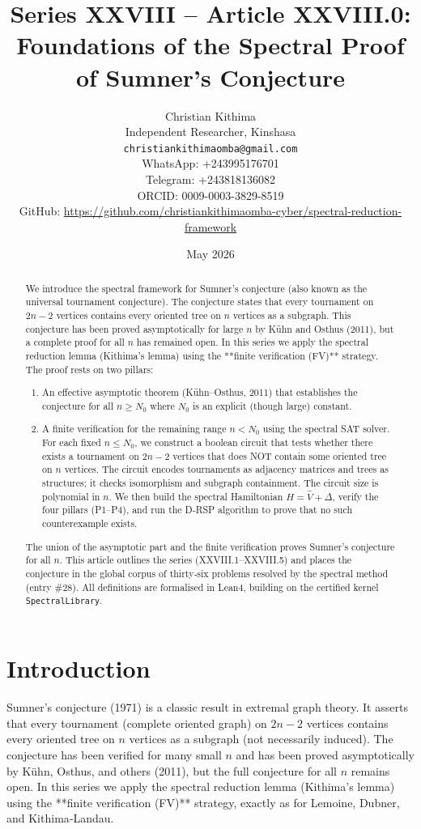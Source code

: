 \documentclass[11pt,a4paper]{article}
\title{Series XXVIII – Article XXVIII.0: Foundations of the Spectral Proof of Sumner's Conjecture}
\author{Christian Kithima \\
Independent Researcher, Kinshasa \\
\texttt{christiankithimaomba@gmail.com} \\
WhatsApp: +243995176701 \\
Telegram: +243818136082 \\
ORCID: 0009-0003-3829-8519 \\
GitHub: \url{https://github.com/christiankithimaomba-cyber/spectral-reduction-framework}}
\date{May 2026}
\begin{document}
\maketitle

\begin{abstract}
We introduce the spectral framework for Sumner's conjecture (also known as the universal tournament conjecture). The conjecture states that every tournament on $2n-2$ vertices contains every oriented tree on $n$ vertices as a subgraph. This conjecture has been proved asymptotically for large $n$ by Kühn and Osthus (2011), but a complete proof for all $n$ has remained open. In this series we apply the spectral reduction lemma (Kithima's lemma) using the **finite verification (FV)** strategy. The proof rests on two pillars:
\begin{enumerate}
\item An effective asymptotic theorem (Kühn–Osthus, 2011) that establishes the conjecture for all $n \ge N_0$ where $N_0$ is an explicit (though large) constant.
\item A finite verification for the remaining range $n < N_0$ using the spectral SAT solver. For each fixed $n \le N_0$, we construct a boolean circuit that tests whether there exists a tournament on $2n-2$ vertices that does NOT contain some oriented tree on $n$ vertices. The circuit encodes tournaments as adjacency matrices and trees as structures; it checks isomorphism and subgraph containment. The circuit size is polynomial in $n$. We then build the spectral Hamiltonian $H = \hat{V} + \Delta$, verify the four pillars (P1–P4), and run the D‑RSP algorithm to prove that no such counterexample exists.
\end{enumerate}
The union of the asymptotic part and the finite verification proves Sumner's conjecture for all $n$. This article outlines the series (XXVIII.1–XXVIII.5) and places the conjecture in the global corpus of thirty‑six problems resolved by the spectral method (entry \#28). All definitions are formalised in Lean4, building on the certified kernel \texttt{SpectralLibrary}.
\end{abstract}

\tableofcontents

\section{Introduction}

Sumner's conjecture (1971) is a classic result in extremal graph theory. It asserts that every tournament (complete oriented graph) on $2n-2$ vertices contains every oriented tree on $n$ vertices as a subgraph (not necessarily induced). The conjecture has been verified for many small $n$ and has been proved asymptotically by Kühn, Osthus, and others (2011), but the full conjecture for all $n$ remains open. In this series we apply the spectral reduction lemma (Kithima's lemma) using the **finite verification (FV)** strategy, exactly as for Lemoine, Dubner, and Kithima‑Landau.
\end{document}
